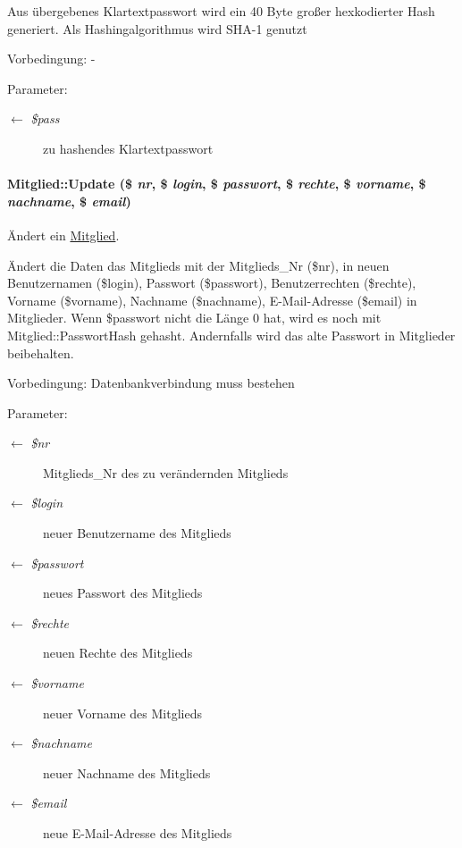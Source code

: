 Aus übergebenes Klartextpasswort wird ein 40 Byte großer hexkodierter Hash generiert. Als Hashingalgorithmus wird SHA-1 genutzt \begin{Desc}
\item[Vorbedingung:]- \end{Desc}
\begin{Desc}
\item[Parameter:]
\begin{description}
\item[\mbox{$\leftarrow$} {\em \$pass}]zu hashendes Klartextpasswort \end{description}
\end{Desc}
\hypertarget{classMitglied_0d173487bebdd0579a70ea007b37b5ec}{
\paragraph[Update]{\setlength{\rightskip}{0pt plus 5cm}Mitglied::Update (\$ {\em nr}, \$ {\em login}, \$ {\em passwort}, \$ {\em rechte}, \$ {\em vorname}, \$ {\em nachname}, \$ {\em email})}\hfill}
\label{classMitglied_0d173487bebdd0579a70ea007b37b5ec}


Ändert ein \hyperlink{classMitglied}{Mitglied}. 

Ändert die Daten das Mitglieds mit der Mitglieds\_\-Nr (\$nr), in neuen Benutzernamen (\$login), Passwort (\$passwort), Benutzerrechten (\$rechte), Vorname (\$vorname), Nachname (\$nachname), E-Mail-Adresse (\$email) in Mitglieder. Wenn \$passwort nicht die Länge 0 hat, wird es noch mit Mitglied::Passwort\-Hash gehasht. Andernfalls wird das alte Passwort in Mitglieder beibehalten. \begin{Desc}
\item[Vorbedingung:]Datenbankverbindung muss bestehen \end{Desc}
\begin{Desc}
\item[Parameter:]
\begin{description}
\item[\mbox{$\leftarrow$} {\em \$nr}]Mitglieds\_\-Nr des zu verändernden Mitglieds \item[\mbox{$\leftarrow$} {\em \$login}]neuer Benutzername des Mitglieds \item[\mbox{$\leftarrow$} {\em \$passwort}]neues Passwort des Mitglieds \item[\mbox{$\leftarrow$} {\em \$rechte}]neuen Rechte des Mitglieds \item[\mbox{$\leftarrow$} {\em \$vorname}]neuer Vorname des Mitglieds \item[\mbox{$\leftarrow$} {\em \$nachname}]neuer Nachname des Mitglieds \item[\mbox{$\leftarrow$} {\em \$email}]neue E-Mail-Adresse des Mitglieds\end{description}
\end{Desc}


